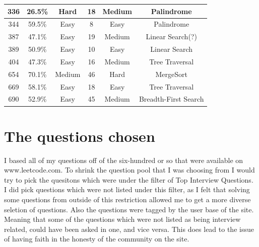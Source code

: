 \documentclass[10pt,twocolumn]{IEEEtran}
\begin{document}
\begin{table}[h!]
\begin{tabular}{||c c c c c c||}
   \hline
  336 & 26.5\% &Hard &18  &Medium&Palindrome\\
  \hline
 344 & 59.5\% &Easy  &8  &Easy&Palindrome\\
  \hline
 387 & 47.1\% &Easy  & 19 &Medium&Linear Search(?)\\
  \hline
 389 & 50.9\% &Easy  & 10 &Easy&Linear Search\\
  \hline
 404 & 47.3\% &Easy  &16  &Medium&Tree Traversal\\
  \hline
 654 & 70.1\% &Medium  &46  &Hard&MergeSort\\
  \hline
 669 &  58.1\%& Easy &18  &Easy&Tree Traversal\\
  \hline
 690 &  52.9\%& Easy &   45&Medium&Breadth-First Search\\[1ex]
 \hline
\end{tabular}
\label{table:tab}
\end{table}

%
%
 
 

\section{The questions chosen}
I based all of my questions off of the six-hundred or so that were available on www.leetcode.com\cite{leet1}. To shrink the question pool that I was choosing from I would try to pick the quesitons which were under the filter of Top Interview Questions. I did pick questions which were not listed under this filter, as I felt that solving some questions from outside of this restriction allowed me to get a more diverse seletion of questions. Also the questions were tagged by the user base of the site. Meaning that some of the questions which were not listed as being interview related, could have been asked in one, and vice versa. This does lead to the issue of having faith in the honesty of the community on the site.  
\end{document}
